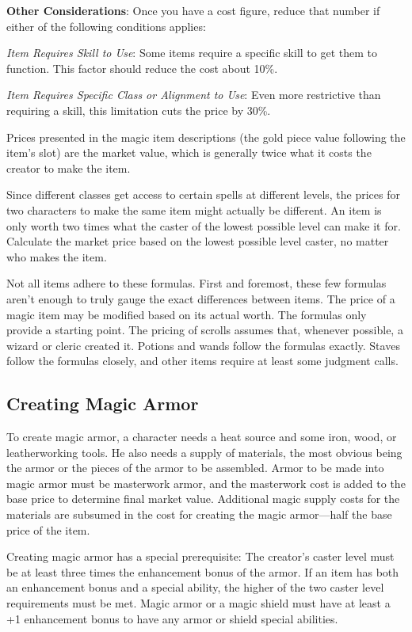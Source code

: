 \textbf{Other Considerations}: Once you have a cost figure, reduce that number if either of the following conditions applies:
				
\textit{Item Requires Skill to Use}: Some items require a specific skill to get them to function. This factor should reduce the cost about 10\%.
				
\textit{Item Requires Specific Class or Alignment to Use}: Even more restrictive than requiring a skill, this limitation cuts the price by 30\%.
				
Prices presented in the magic item descriptions (the gold piece value following the item's slot) are the market value, which is generally twice what it costs the creator to make the item.
				
Since different classes get access to certain spells at different levels, the prices for two characters to make the same item might actually be different. An item is only worth two times what the caster of the lowest possible level can make it for. Calculate the market price based on the lowest possible level caster, no matter who makes the item.
				
Not all items adhere to these formulas. First and foremost, these few formulas aren't enough to truly gauge the exact differences between items. The price of a magic item may be modified based on its actual worth. The formulas only provide a starting point. The pricing of scrolls assumes that, whenever possible, a wizard or cleric created it. Potions and wands follow the formulas exactly. Staves follow the formulas closely, and other items require at least some judgment calls.
				
\subsection{Creating Magic Armor}

				
To create magic armor, a character needs a heat source and some iron, wood, or leatherworking tools. He also needs a supply of materials, the most obvious being the armor or the pieces of the armor to be assembled. Armor to be made into magic armor must be masterwork armor, and the masterwork cost is added to the base price to determine final market value. Additional magic supply costs for the materials are subsumed in the cost for creating the magic armor---half the base price of the item.
				
Creating magic armor has a special prerequisite: The creator's caster level must be at least three times the enhancement bonus of the armor. If an item has both an enhancement bonus and a special ability, the higher of the two caster level requirements must be met. Magic armor or a magic shield must have at least a +1 enhancement bonus to have any armor or shield special abilities.
				
